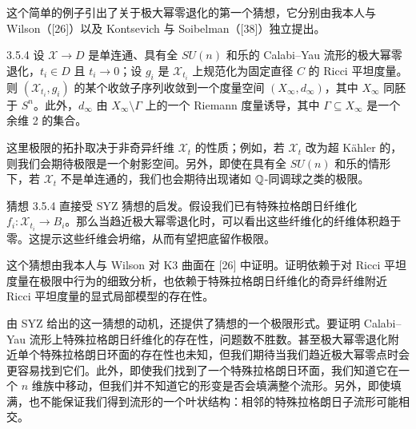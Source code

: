 这个简单的例子引出了关于极大幂零退化的第一个猜想，它分别由我本人与 Wilson（[26]）以及 Kontsevich 与 Soibelman（[38]）独立提出。

\begin{conjecture}{3.5.4}
设 $\mathcal{X}\to D$ 是单连通、具有全 $SU(n)$ 和乐的 Calabi--Yau 流形的极大幂零退化，$t_i\in D$ 且 $t_i\to0$；设 $g_i$ 是 $\mathcal{X}_{t_i}$ 上规范化为固定直径 $C$ 的 Ricci 平坦度量。则 $(\mathcal{X}_{t_i},g_i)$ 的某个收敛子序列收敛到一个度量空间 $(X_\infty,d_\infty)$，其中 $X_\infty$ 同胚于 $S^n$。此外，$d_\infty$ 由 $X_\infty\setminus\Gamma$ 上的一个 Riemann 度量诱导，其中 $\Gamma\subseteq X_\infty$ 是一个余维 2 的集合。
\end{conjecture}

这里极限的拓扑取决于非奇异纤维 $\mathcal{X}_t$ 的性质；例如，若 $\mathcal{X}_t$ 改为超 Kähler 的，则我们会期待极限是一个射影空间。另外，即使在具有全 $SU(n)$ 和乐的情形下，若 $\mathcal{X}_t$ 不是单连通的，我们也会期待出现诸如 $\mathbb{Q}$-同调球之类的极限。

猜想 3.5.4 直接受 SYZ 猜想的启发。假设我们已有特殊拉格朗日纤维化 $f_i:\mathcal{X}_{t_i}\to B_i$。那么当趋近极大幂零退化时，可以看出这些纤维化的纤维体积趋于零。这提示这些纤维会坍缩，从而有望把底留作极限。

这个猜想由我本人与 Wilson 对 K3 曲面在 [26] 中证明。证明依赖于对 Ricci 平坦度量在极限中行为的细致分析，也依赖于特殊拉格朗日纤维化的奇异纤维附近 Ricci 平坦度量的显式局部模型的存在性。

由 SYZ 给出的这一猜想的动机，还提供了猜想的一个极限形式。要证明 Calabi--Yau 流形上特殊拉格朗日纤维化的存在性，问题数不胜数。甚至极大幂零退化附近单个特殊拉格朗日环面的存在性也未知，但我们期待当我们趋近极大幂零点时会更容易找到它们。此外，即使我们找到了一个特殊拉格朗日环面，我们知道它在一个 $n$ 维族中移动，但我们并不知道它的形变是否会填满整个流形。另外，即使填满，也不能保证我们得到流形的一个叶状结构：相邻的特殊拉格朗日子流形可能相交。
